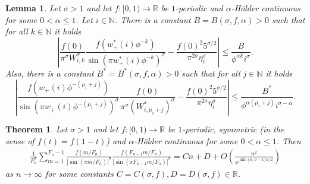 \documentclass[10pt,a4paper]{amsart}
\newtheorem{thm}{Theorem}
\newtheorem{lem}{Lemma}
\newcommand{\bbN}{\mathbb{N}}
\newcommand{\bbR}{\mathbb{R}}
\newcommand{\ra}{\rightarrow}
\begin{document}
\begin{lem} \label{lem:exp_decay}
    Let $\sigma > 1$ and let $f:[0, 1) \rightarrow \bbR$ be $1$-periodic and $\alpha$-Hölder continuous for some $0<\alpha\leq 1$. Let $i \in \bbN$. There is a constant $B = B(\sigma, f, \alpha) > 0$ such that for all $k \in \bbN$ it holds
    $$
    \left|\frac{f(0)}{\pi^\sigma W_{i, k}^\sigma} \frac{f(w_+^*(i) \phi^{-k})}{{\sin(\pi w_+^*(i) \phi^{-k})}^\sigma} - \frac{f(0)^2 5^{\sigma/2}}{\pi^{2\sigma} \eta_i^\sigma}\right| \leq \frac{B}{\phi^{\alpha k} i^\sigma}.
    $$
    Also, there is a constant $B^* = B^*(\sigma, f, \alpha) > 0$ such that for all $j \in \bbN$ it holds%
    $$
    \left|\frac{f(w_+(i) \phi^{-(\mu_i+j)})}{{\sin(\pi w_+(i) \phi^{-(\mu_i+j)})}^\sigma} \frac{f(0)}{\pi^\sigma (W_{i, \mu_i+j}^*)^\sigma} - \frac{f(0)^2 5^{\sigma/2}}{\pi^{2\sigma} \eta_i^\sigma}\right| \leq \frac{B^*}{\phi^{\alpha (\mu_i+j)} i^{\sigma-\alpha}}.
    $$
\end{lem}

\begin{thm} \label{thm:asymp}
    Let $\sigma > 1$ and let $f: [0, 1) \ra \bbR$ be $1$-periodic, symmetric (in the sense of $f(t) = f(1-t)$) and $\alpha$-Hölder continuous for some $0 < \alpha \leq 1$. Then
    \begin{align} \label{eq:asymp_expansion}
        \frac1{F_n^\sigma} \sum_{m = 1}^{F_n-1} \frac{f(m/F_n)}{\left|{\sin(\pi m/F_n)}\right|^\sigma} \frac{f(F_{n-1}m/F_n)}{\left|{\sin(\pi F_{n-1}m/F_n)}\right|^\sigma} = Cn + D + O\left(\frac{n^2}{\phi^{\min\{\alpha, \sigma-1\} n/2}}\right)
    \end{align}
    as $n \ra \infty$ for some constants $C=C(\sigma, f), D=D(\sigma, f) \in \bbR$.
\end{thm}
\end{document}
